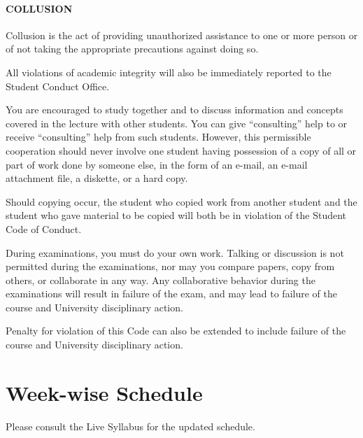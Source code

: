 \documentclass[a4paper]{article}
\begin{document}
\paragraph{COLLUSION} Collusion is the act of providing unauthorized assistance to one or more person or of not taking the appropriate precautions against doing so.

All violations of academic integrity will also be immediately reported to the Student Conduct Office.  

You are encouraged to study together and to discuss information and concepts covered in the lecture with other students. You can give ``consulting'' help to or receive ``consulting'' help from such students. However, this permissible cooperation should never involve one student having possession of a copy of all or part of work done by someone else, in the form of an e-mail, an e-mail attachment file, a diskette, or a hard copy. 

Should copying occur, the student who copied work from another student and the student who gave material to be copied will both be in violation of the Student Code of Conduct. 

During examinations, you must do your own work. Talking or discussion is not permitted during the examinations, nor may you compare papers, copy from others, or collaborate in any way. Any collaborative behavior during the examinations will result in failure of the exam, and may lead to failure of the course and University disciplinary action.

Penalty for violation of this Code can also be extended to include failure of the course and University disciplinary action. 

\section{Week-wise Schedule}

Please consult the Live Syllabus for the updated schedule.
\end{document}
